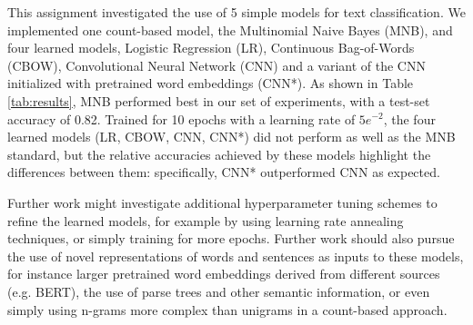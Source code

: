\documentclass[11pt]{article}
\begin{document}
This assignment investigated the use of 5 simple models for text classification. We implemented one count-based model, the Multinomial Naive Bayes (MNB), and four learned models, Logistic Regression (LR), Continuous Bag-of-Words (CBOW), Convolutional Neural Network (CNN) and a variant of the CNN initialized with pretrained word embeddings (CNN*). As shown in Table \ref{tab:results}, MNB performed best in our set of experiments, with a test-set accuracy of 0.82. Trained for 10 epochs with a learning rate of $5e^{-2}$, the four learned models (LR, CBOW, CNN, CNN*) did not perform as well as the MNB standard, but the relative accuracies achieved by these models highlight the differences between them: specifically, CNN* outperformed CNN as expected.

Further work might investigate additional hyperparameter tuning schemes to refine the learned models, for example by using learning rate annealing techniques, or simply training for more epochs. Further work should also pursue the use of novel representations of words and sentences as inputs to these models, for instance larger pretrained word embeddings derived from different sources (e.g. BERT), the use of parse trees and other semantic information, or even simply using n-grams more complex than unigrams in a count-based approach.




\end{document}
